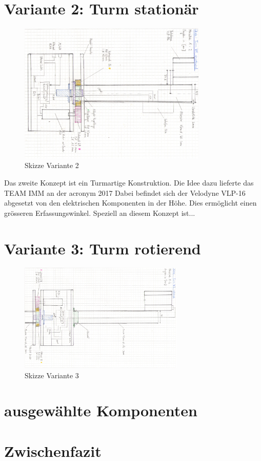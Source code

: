  

\section {Variante 2: Turm stationär}
\label{sec:var2}

\begin{figure}[H]
	\centering
	\includegraphics[angle=90,width=0.8\textwidth]{resources/skizze_unrotierend.PNG}
	\caption{Skizze Variante 2 }
	\label{fig:skizze_unrotierend}
\end{figure} 

Das zweite Konzept ist ein Turmartige Konstruktion. Die Idee dazu lieferte das TEAM IMM an der \ac{acronym} 2017 Dabei befindet sich der Velodyne VLP-16 abgesetzt von den elektrischen Komponenten in der Höhe. Dies ermöglicht einen grösseren Erfassungswinkel. Speziell an diesem Konzept ist...


\section {Variante 3: Turm rotierend}
\label{sec:var3}

\begin{figure}[H]
	\centering
	\includegraphics[angle=90,width=0.7\textwidth]{resources/skizze_rotierend.PNG}
	\caption{Skizze Variante 3 }
	\label{fig:skizze_rotierend}
\end{figure} 

\section {ausgewählte Komponenten}
\label{sec:ausgewählteKomponenten}

\section{Zwischenfazit}
\label{ZwischenfazitKonz}

